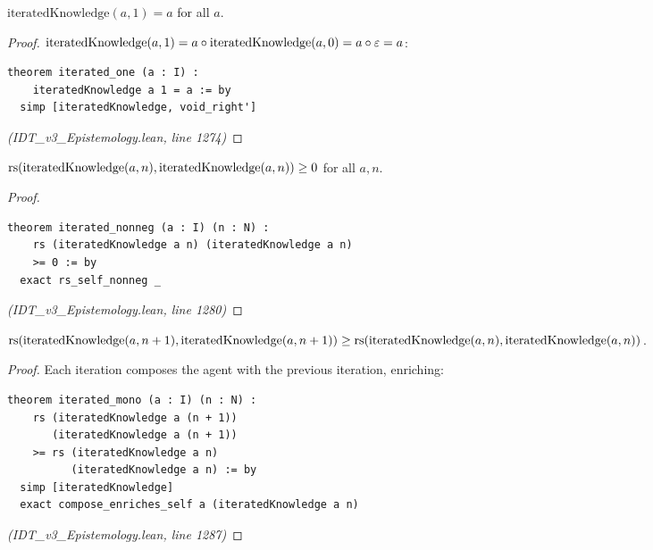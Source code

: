 \begin{theorem}
\label{thm:iterated-one}
$\mathrm{iteratedKnowledge}(a, 1) = a$ for all $a$.
\end{theorem}

\begin{proof}
$\mathrm{iteratedKnowledge}(a, 1) = a \circ \mathrm{iteratedKnowledge}(a, 0)
= a \circ \varepsilon = a$:
\begin{lstlisting}
theorem iterated_one (a : I) :
    iteratedKnowledge a 1 = a := by
  simp [iteratedKnowledge, void_right']
\end{lstlisting}
\textit{(IDT\_v3\_Epistemology.lean, line 1274)}
\end{proof}

\begin{theorem}
\label{thm:iterated-nonneg}
$\mathrm{rs}(\mathrm{iteratedKnowledge}(a, n), \mathrm{iteratedKnowledge}(a, n)) \geq 0$
for all $a, n$.
\end{theorem}

\begin{proof}
\begin{lstlisting}
theorem iterated_nonneg (a : I) (n : N) :
    rs (iteratedKnowledge a n) (iteratedKnowledge a n)
    >= 0 := by
  exact rs_self_nonneg _
\end{lstlisting}
\textit{(IDT\_v3\_Epistemology.lean, line 1280)}
\end{proof}

\begin{theorem}
\label{thm:iterated-mono}
$\mathrm{rs}(\mathrm{iteratedKnowledge}(a, n+1), \mathrm{iteratedKnowledge}(a, n+1))
\geq \mathrm{rs}(\mathrm{iteratedKnowledge}(a, n), \mathrm{iteratedKnowledge}(a, n))$.
\end{theorem}

\begin{proof}
Each iteration composes the agent with the previous iteration, enriching:
\begin{lstlisting}
theorem iterated_mono (a : I) (n : N) :
    rs (iteratedKnowledge a (n + 1))
       (iteratedKnowledge a (n + 1))
    >= rs (iteratedKnowledge a n)
          (iteratedKnowledge a n) := by
  simp [iteratedKnowledge]
  exact compose_enriches_self a (iteratedKnowledge a n)
\end{lstlisting}
\textit{(IDT\_v3\_Epistemology.lean, line 1287)}
\end{proof}

